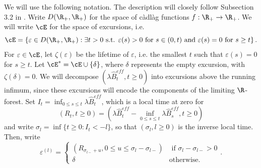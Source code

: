 We will use the following notation. The description will closely follow Subsection 3.2 in \cite{conchon--kerjanStableGraphMetric2020}. Write $D(\R_+,\R_+)$ for the space of c\`adl\`ag functions $f:\R_+\to \R_+$. We will write $\cE$ for the space of excursions, i.e.
$$\cE=\left\{\varepsilon \in D(\R_+,\R_+):\exists t>0\text{ s.t. }\varepsilon(s)>0\text{ for }s\in (0,t)\text{ and }\varepsilon(s)=0\text{ for }s\geq t\right\}.$$
For $\varepsilon\in \cE$, let $\zeta(\varepsilon)$ be the lifetime of $\varepsilon$, i.e. the smallest $t$ such that $\varepsilon(s)=0$ for $s\geq t$. Let $\cE^*=\cE\cup\{\delta\}$, where $\delta$ represents the empty excursion, with $\zeta(\delta)=0$. We will decompose $(\lambda \hat{B}^{eff}_t,t\geq 0)$ into excursions above the running infimum, since these excursions will encode the components of the limiting $\R$-forest. Set $I_t=\inf_{0\leq s\leq t}\lambda \hat{B}_t^{eff}$, which is a local time at zero for 
$$(R_t,t\geq 0)=\left(\lambda \hat{B}_t^{eff}-\inf_{0\leq s \leq t}\lambda \hat{B}_s^{eff},t\geq 0\right)$$  and write $\sigma _l=\inf\{t\geq 0: I_t<-l\}$, so that $(\sigma_l, l\geq 0)$ is the inverse local time. Then, write 
$$\varepsilon^{(l)}=\begin{cases}(R_{\sigma_{l-}+u}, 0\leq u \leq \sigma_l-\sigma_{l-})&\text{ if }\sigma_l-\sigma_{l-}>0\\ \delta &\text{otherwise.}\end{cases}.$$

